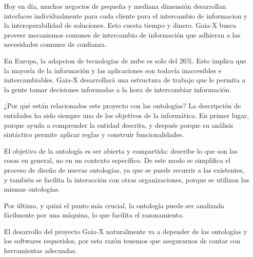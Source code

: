 Hoy en día, muchos negocios de pequeña y mediana dimensión desarrollan interfaces individualmente para cada cliente para el intercambio de informacion y la interoperabilidad de soluciones. Esto cuesta tiempo y dinero. Gaia-X busca proveer mecanismos comunes de intercambio de información que adhieran a las necesidades comunes de confianza.

En Europa, la adapcion de tecnologías de nube es solo del 26\%. Esto implica que la mayoría de la información y las aplicaciones son todavía inaccesibles e initercambiables. Gaia-X desarrollará una estructura de trabajo que le permita a la gente tomar decisiones informadas a la hora de intercambiar información. 

¿Por qué están relacionados este proyecto con las ontologías? La descripción de entidades ha sido siempre uno de los objetivos de la informática. En primer lugar, porque ayuda a comprender la entidad descrita, y después porque su análisis sintáctico permite aplicar reglas y construir funcionalidades.

El objetivo de la ontología es ser abierta y compartida: describe lo que son las cosas en general, no en un contexto específico. De este modo se simplifica el proceso de diseño de nuevas ontologías, ya que se puede recurrir a las existentes, y también se facilita la interacción con otras organizaciones, porque se utilizan las mismas ontologías.

Por último, y quizá el punto más crucial, la ontología puede ser analizada fácilmente por una máquina, lo que facilita el razonamiento. \cite[]{GaiaxOntology}

El desarrollo del proyecto Gaia-X naturalmente va a depender de las ontologías y los softwares requeridos, por esta razón tenemos que asegurarnos de contar con herramientas adecuadas.
